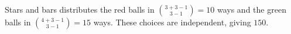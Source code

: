 Stars and bars distributes the red balls in $\binom{3+3-1}{3-1}=10$ ways and the green balls in $\binom{4+3-1}{3-1}=15$ ways. These choices are independent, giving $\boxed{150}$.
